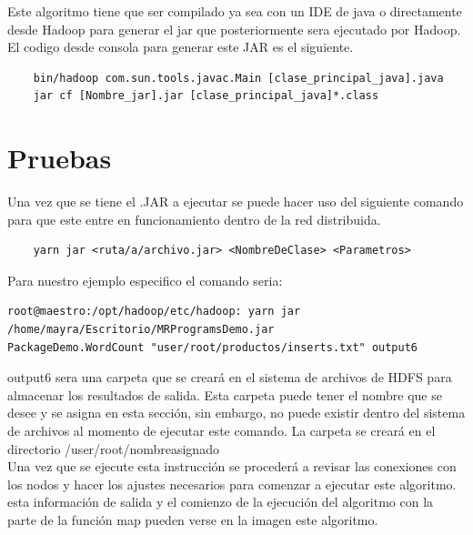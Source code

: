 Este algoritmo tiene que ser compilado ya sea con un IDE de java o directamente desde Hadoop para generar el jar
que posteriormente sera ejecutado por Hadoop.
\\
El codigo desde consola para generar este JAR es el siguiente.
\\
\begin{verbatim}
	bin/hadoop com.sun.tools.javac.Main [clase_principal_java].java
	jar cf [Nombre_jar].jar [clase_principal_java]*.class
\end{verbatim}
\section{Pruebas}
Una vez que se tiene el .JAR a ejecutar se puede hacer uso del siguiente comando para que este entre en funcionamiento dentro de la red distribuida.
\\
\begin{verbatim}
	yarn jar <ruta/a/archivo.jar> <NombreDeClase> <Parametros>
\end{verbatim}
Para nuestro ejemplo especifico el comando seria:
\begin{verbatim}
root@maestro:/opt/hadoop/etc/hadoop: yarn jar /home/mayra/Escritorio/MRProgramsDemo.jar 
PackageDemo.WordCount "user/root/productos/inserts.txt" output6
\end{verbatim}
output6 sera una carpeta que se creará en el sistema de archivos de HDFS para almacenar los resultados de salida.
Esta carpeta puede tener el nombre que se desee y se asigna en esta sección, sin embargo, no puede existir dentro del
sistema de archivos al momento de ejecutar este comando. La carpeta se creará en el directorio /user/root/nombreasignado
\\
Una vez que se ejecute esta instrucción se procederá a revisar las conexiones con los nodos y hacer los ajustes necesarios
para comenzar a ejecutar este algoritmo.
esta información de salida y el comienzo de la ejecución del algoritmo con la parte de la función map pueden verse en
la imagen 
este algoritmo.
